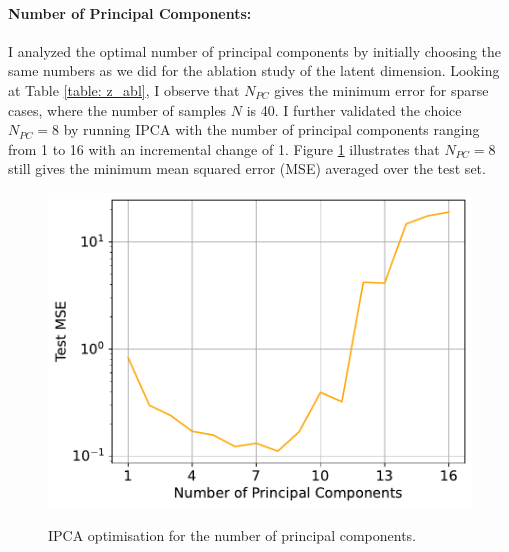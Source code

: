 \paragraph{Number of Principal Components:}
I analyzed the optimal number of principal components by initially choosing the same numbers as we did for the ablation study of the latent dimension. Looking at Table \ref{table: z_abl}, I observe that $N_{PC}$ gives the minimum error for sparse cases, where the number of samples $N$ is 40. I further validated the choice $N_{PC} = 8$ by running IPCA with the number of principal components ranging from 1 to 16 with an incremental change of 1. Figure \ref{fig:ipca_opt} illustrates that $N_{PC} = 8$ still gives the minimum mean squared error (MSE) averaged over the test set.


\begin{figure}[ht]
  \centering

  {\includegraphics[width=0.6\linewidth]{Chapters/hyperbrdf-figs/ipca_opt_q_40_cropped.pdf}}
   \caption{IPCA optimisation for the number of principal components.}
   \label{fig:ipca_opt}
\end{figure}

\begin{table}[ht]
    \centering
    \caption{Average mean squared errors for varying latent space dimensions (first row) and number of principal components (second row).}

    \label{table: z_abl}
\end{table}


